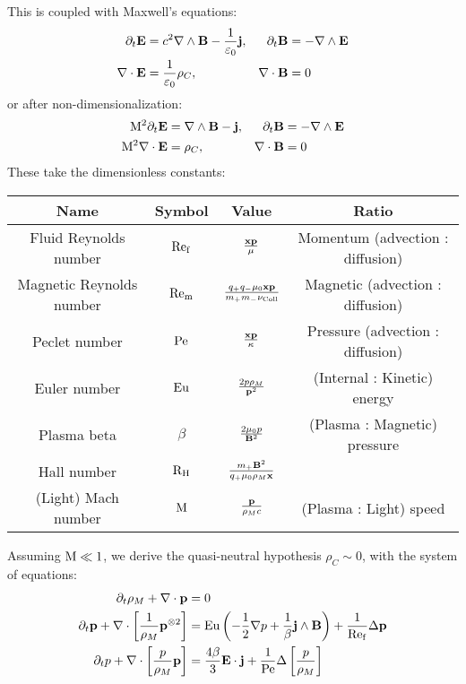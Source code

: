     This is coupled with Maxwell's equations:
    \begin{align*}
        \partial_{t}\mathbf{E}  &=  c^{2}\nabla\wedge\mathbf{B} - \frac{1}{\varepsilon_{0}}\mathbf{j},  &
        \partial_{t}\mathbf{B}  &=  - \nabla\wedge\mathbf{E}  \\
        \nabla\cdot\mathbf{E}  &=  \frac{1}{\varepsilon_{0}}\rho_{C},  &
        \nabla\cdot\mathbf{B}  &=  0
    \end{align*}
    or after non-dimensionalization:
    \begin{align*}
        \mathrm{M}^{2}\partial_{t}\mathbf{E}  &=  \nabla\wedge\mathbf{B} - \mathbf{j},  &
        \partial_{t}\mathbf{B}  &=  - \nabla\wedge\mathbf{E}  \\
        \mathrm{M}^{2}\nabla\cdot\mathbf{E}  &=  \rho_{C},  &
        \nabla\cdot\mathbf{B}  &=  0
    \end{align*}
    These take the dimensionless constants: 
    \begin{center}\begin{tabular}{ c c c c }
        Name  &  Symbol  &  Value  &  Ratio  \\
        \hline\hline
        Fluid Reynolds number  &  $\mathrm{Re}_{\mathrm{f}}$  &  $\frac{\mathbf{x}\mathbf{p}}{\mu}$  &  Momentum (advection : diffusion)  \\
        Magnetic Reynolds number  &  $\mathrm{Re}_{\mathrm{m}}$  &  $\frac{q_{+}q_{-}\mu_{0}\mathbf{x}\mathbf{p}}{m_{+}m_{-}\nu_{\rm Coll}}$  &  Magnetic (advection : diffusion)  \\
        Peclet number  &  $\mathrm{Pe}$  &  $\frac{\mathbf{x}\mathbf{p}}{\kappa}$  &  Pressure (advection : diffusion)  \\
        \hline
        Euler number  &  $\mathrm{Eu}$  &  $\frac{2p\rho_{M}}{\mathbf{p}^{2}}$  &  (Internal : Kinetic) energy  \\
        Plasma beta  &  $\beta$  &  $\frac{2\mu_{0}p}{\mathbf{B}^{2}}$  &  (Plasma : Magnetic) pressure  \\
        Hall number  &  $\mathrm{R}_{\mathrm{H}}$  &  $\frac{m_{+}\mathbf{B}^{2}}{q_{+}\mu_{0}\rho_{M}\mathbf{x}}$  &  \BA{??}  \\
        (Light) Mach number  &  $\mathrm{M}$  &  $\frac{\mathbf{p}}{\rho_{M}c}$  &  (Plasma : Light) speed
    \end{tabular}\end{center}
    Assuming $\mathrm{M}  \ll  1$, we derive the quasi-neutral hypothesis $\rho_{C}  \sim  0$, with the system of equations:
    \begin{align}
        \partial_{t}\rho_{M} + \nabla\cdot\mathbf{p}  &=  0  \label{eqn:mass conservation} 
         \\
        \partial_{t}\mathbf{p} + \nabla\cdot\left[\frac{1}{\rho_{M}}\mathbf{p}^{\otimes 2}\right]  &=  \mathrm{Eu}\left(- \frac{1}{2}\nabla p + \frac{1}{\beta}\mathbf{j}\wedge\mathbf{B}\right) + \frac{1}{\mathrm{Re}_{\mathrm{f}}}\Delta\mathbf{p}  \label{eqn:momentum conservation}  \\
        \partial_{t}p + \nabla\cdot\left[\frac{p}{\rho_{M}}\mathbf{p}\right]  &=  \frac{4\beta}{3}\mathbf{E}\cdot\mathbf{j} + \frac{1}{\mathrm{Pe}}\Delta\left[\frac{p}{\rho_{M}}\right]  \label{eqn:energy conservation}
    \end{align}
